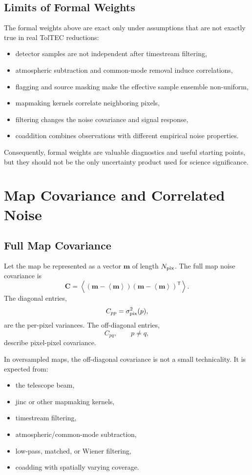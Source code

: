 \documentclass[11pt]{article}
\newcommand{\map}{\boldsymbol{m}}
\newcommand{\cov}{\boldsymbol{C}}
\newcommand{\trans}{\mathsf{T}}
\newcommand{\expect}[1]{\left\langle #1 \right\rangle}
\begin{document}
\subsection{Limits of Formal Weights}

The formal weights above are exact only under assumptions that are not exactly
true in real TolTEC reductions:

\begin{itemize}[leftmargin=1.5em]
\item detector samples are not independent after timestream filtering,
\item atmospheric subtraction and common-mode removal induce correlations,
\item flagging and source masking make the effective sample ensemble
non-uniform,
\item mapmaking kernels correlate neighboring pixels,
\item filtering changes the noise covariance and signal response,
\item coaddition combines observations with different empirical noise
properties.
\end{itemize}

Consequently, formal weights are valuable diagnostics and useful starting
points, but they should not be the only uncertainty product used for science
significance.

\section{Map Covariance and Correlated Noise}

\subsection{Full Map Covariance}

Let the map be represented as a vector \(\map\) of length \(N_{\rm pix}\). The
full map noise covariance is
\[
  \cov =
    \expect{
      (\map - \expect{\map})
      (\map - \expect{\map})^\trans
    }.
\]
The diagonal entries,
\[
  C_{pp} = \sigma^2_{\rm pix}(p),
\]
are the per-pixel variances. The off-diagonal entries,
\[
  C_{pq}, \qquad p\ne q,
\]
describe pixel-pixel covariance.

In oversampled maps, the off-diagonal covariance is not a small technicality.
It is expected from:

\begin{itemize}[leftmargin=1.5em]
\item the telescope beam,
\item jinc or other mapmaking kernels,
\item timestream filtering,
\item atmospheric/common-mode subtraction,
\item low-pass, matched, or Wiener filtering,
\item coadding with spatially varying coverage.
\end{itemize}
\end{document}
